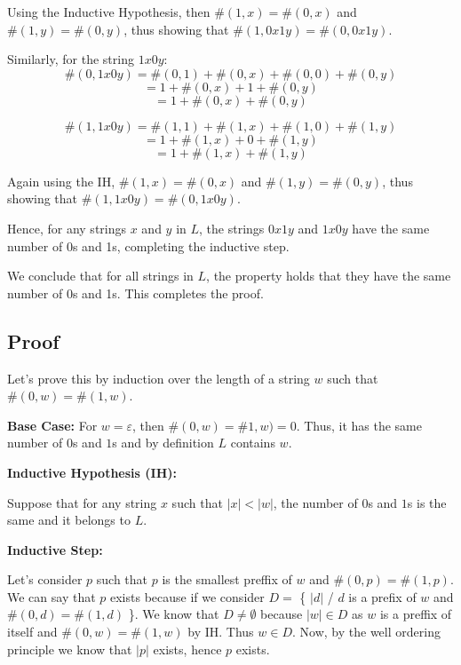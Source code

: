 \documentclass[12pt]{article}
\begin{document}
Using the Inductive Hypothesis, then \(\#(1,x) = \#(0,x)\) and \(\#(1,y) = \#(0,y)\), thus showing that \(\#(1,0x1y) = \#(0,0x1y)\).

Similarly, for the string \(1x0y\):
\[
\#(0,1x0y) = \#(0,1) + \#(0,x) + \#(0,0) + \#(0,y)
\]
\[
= 1 + \#(0,x) + 1 + \#(0,y)
\]
\[
= 1 + \#(0,x) + \#(0,y)
\]

\[
\#(1,1x0y) = \#(1,1) + \#(1,x) + \#(1,0) + \#(1,y)
\]
\[
= 1 + \#(1,x) + 0 + \#(1,y)
\]
\[
= 1 + \#(1,x) + \#(1,y)
\]

Again using the IH, \(\#(1,x) = \#(0,x)\) and \(\#(1,y) = \#(0,y)\), thus showing that \(\#(1,1x0y) = \#(0,1x0y)\).

Hence, for any strings \(x\) and \(y\) in \(L\), the strings \(0x1y\) and \(1x0y\) have the same number of 0s and 1s, completing the inductive step.

We conclude that for all strings in \(L\), the property holds that they have the same number of 0s and 1s. This completes the proof.

\subsection{Proof}

Let's prove this by induction over the length of a string $w$ such that $\#(0,w)=\#(1,w)$.

\textbf{Base Case:}
For $w = \varepsilon$, then $\#(0,w)=\#1,w)=0$. Thus, it has the same number of $0$s and $1$s and by definition $L$ contains $w$.

\textbf{Inductive Hypothesis (IH):}

Suppose that for any string $x$ such that $|x|<|w|$, the number of $0$s and $1$s is the same and it belongs to $L$.

\textbf{Inductive Step:}

Let's consider $p$ such that $p$ is the smallest preffix of $w$ and $\#(0,p)=\#(1,p)$. We can say that $p$ exists because if we consider $D =$ \{ $|d|$ / $d$ is a prefix of $w$ and $\#(0,d)=\#(1,d)$ \}. We know that $D \neq \emptyset$ because $|w| \in D$ as $w$ is a preffix of itself and $\#(0,w)=\#(1,w)$ by IH. Thus $w \in D$. Now, by the well ordering principle we know that $|p|$ exists, hence $p$ exists.
\end{document}
